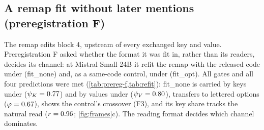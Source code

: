 \begin{table}[!ht]
\centering
\caption{\textbf{The intervention of \citet{anonymous2026fitted} across formats.} $\varphi$: behavioural shift of the learned remap M relative to the PCA patch P, as a fraction of the natural source-to-target shift (\cref{eq:phi}). $\psi_K$, $\psi_V$: fraction of the M$-$P difference that P reproduces when given M's keys or values at the writing token (\cref{eq:psik,eq:psiv}). $\chi_K$, $\chi_V$: fraction of that difference that M loses when given P's keys or values (\cref{app:impl}). Exchanges from block~6 on. $n = 96$ story cores with B, S and T distinct, three fits averaged within each core; 95\% bootstrap CIs over cores. Preregistrations C (C1--C3) and E (E4) for the cells they name; the rest exploratory.}
\label{tab:frames}
\resizebox{\textwidth}{!}{}
\end{table}

\subsection{A remap fit without later mentions (preregistration F)}\label{app:refit}\label{sec:refit}

The remap edits block 4, upstream of every exchanged key and value. Preregistration F asked whether the format it was fit in, rather than its readers, decides its channel: at Mistral-Small-24B it refit the remap with the released code under \fmtNone{} (fit\_none) and, as a same-code control, under \fmtOpt{} (fit\_opt). All gates and all four predictions were met (\cref{tab:prereg-f,tab:refit}): fit\_none is carried by keys under \fmtLetter{} ($\psi_K = 0.77{}$) and by values under \fmtNone{} ($\psi_V = 0.80{}$), transfers to lettered options ($\varphi = 0.67{}$), shows the control's crossover (F3), and its key share tracks the natural read ($r = 0.96{}$; \cref{fig:frames}c). The reading format decides which channel dominates.

